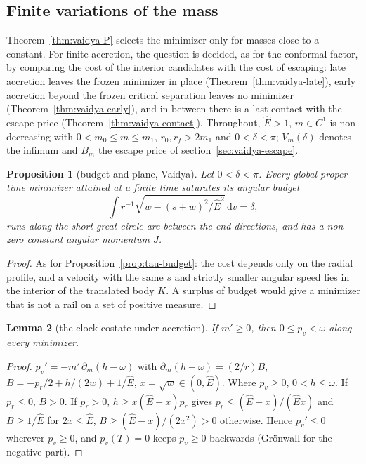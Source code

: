 \documentclass[aip,jmp,amsmath,amssymb,reprint]{revtex4-2}
\newcommand{\Ehat}{\hat E}
\newcommand{\dd}{\mathrm{d}}
\theoremstyle{plain}
\newtheorem{proposition}{Proposition}[section]
\newtheorem{lemma}[proposition]{Lemma}
\theoremstyle{definition}
\begin{document}
\subsection{Finite variations of the mass}
\label{sec:vaidya-var}
Theorem~\ref{thm:vaidya-P} selects the minimizer only for masses close to a constant. For finite
accretion, the question is decided, as for the conformal factor, by comparing the cost of the interior
candidates with the cost of escaping: late accretion leaves the frozen minimizer in place
(Theorem~\ref{thm:vaidya-late}), early accretion beyond the frozen critical separation leaves no
minimizer (Theorem~\ref{thm:vaidya-early}), and in between there is a last contact with the escape price
(Theorem~\ref{thm:vaidya-contact}). Throughout, $\Ehat>1$, $m\in C^1$ is non-decreasing with
$0<m_0\le m\le m_1$, $r_0,r_f>2m_1$ and $0<\delta<\pi$; $V_m(\delta)$ denotes the infimum and $B_m$ the escape price of
section~\ref{sec:vaidya-escape}.

\begin{proposition}[budget and plane, Vaidya]\label{prop:vaidya-budget}
Let $0<\delta<\pi$. Every global proper-time minimizer attained at a finite time saturates its angular budget
\[
  \int r^{-1}\sqrt{w-(s+w)^2/\Ehat^2}\,\dd v=\delta,
\]
runs along the short great-circle arc between the end
directions, and has a non-zero constant angular momentum $J$.
\end{proposition}

\begin{proof}
As for Proposition~\ref{prop:tau-budget}: the cost depends only on the radial profile, and a velocity with the
same $s$ and strictly smaller angular speed lies in the interior of the translated body $K$. A surplus of
budget would give a minimizer that is not a rail on a set of positive measure.
\end{proof}

\begin{lemma}[the clock costate under accretion]\label{lem:vaidya-q}
If $m'\ge0$, then $0\le p_v<\omega$ along every minimizer.
\end{lemma}

\begin{proof}
$p_v'=-m'\,\partial_m(h-\omega)$ with $\partial_m(h-\omega)=(2/r)B$, $B=-p_r/2+h/(2w)+1/\Ehat$, $x=\sqrt w\in(0,\Ehat)$.
Where $p_v\ge0$, $0<h\le\omega$. If $p_r\le0$, $B>0$. If $p_r>0$, $h\ge x(\Ehat-x)p_r$ gives
$p_r\le(\Ehat+x)/(\Ehat x)$ and $B\ge1/\Ehat$ for $2x\le\Ehat$, $B\ge(\Ehat-x)/(2x^2)>0$ otherwise. Hence $p_v'\le0$
wherever $p_v\ge0$, and $p_v(T)=0$ keeps $p_v\ge0$ backwards (Gr\"onwall for the negative part).
\end{proof}
\end{document}

